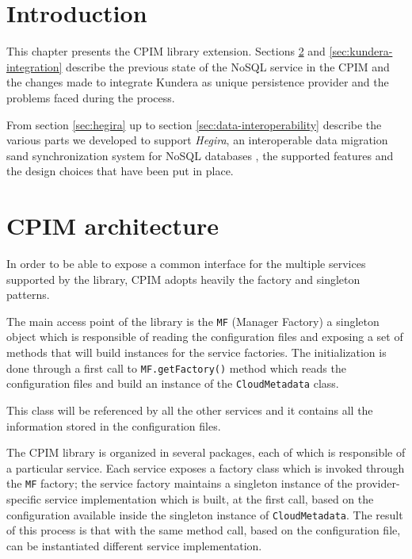 \section{Introduction}
This chapter presents the CPIM library extension. Sections \ref{sec:cpim-architecture} and \ref{sec:kundera-integration} describe the previous state of the NoSQL service in the CPIM and the changes made to integrate Kundera as unique persistence provider and the problems faced during the process.

\noindent From section \ref{sec:hegira} up to section \ref{sec:data-interoperability} describe the various parts we developed to support \textit{Hegira}, an interoperable data migration sand synchronization system for NoSQL databases \cite{paper:modaclouds-deliverable}, the supported features and the design choices that have been put in place. 

\section{CPIM architecture}
\label{sec:cpim-architecture}
In order to be able to expose a common interface for the multiple services supported by the library, CPIM adopts heavily the factory and singleton patterns.

\noindent The main access point of the library is the \texttt{MF} (Manager Factory) a singleton object which is responsible of reading the configuration files and exposing a set of methods that will build instances for the service factories.
The initialization is done through a first call to \texttt{MF.getFactory()} method which reads the configuration files and build an instance of the \texttt{CloudMetadata} class. 

\noindent This class will be referenced by all the other services and it contains all the information stored in the configuration files.
 
\newparagraph The CPIM library is organized in several packages, each of which is responsible of a particular service.
\noindent Each service exposes a factory class which is invoked through the \texttt{MF} factory; the service factory maintains a singleton instance of the provider-specific service implementation which is built, at the first call, based on the configuration available inside the singleton instance of \texttt{CloudMetadata}.
The result of this process is that with the same method call, based on the configuration file, can be instantiated different service implementation.

